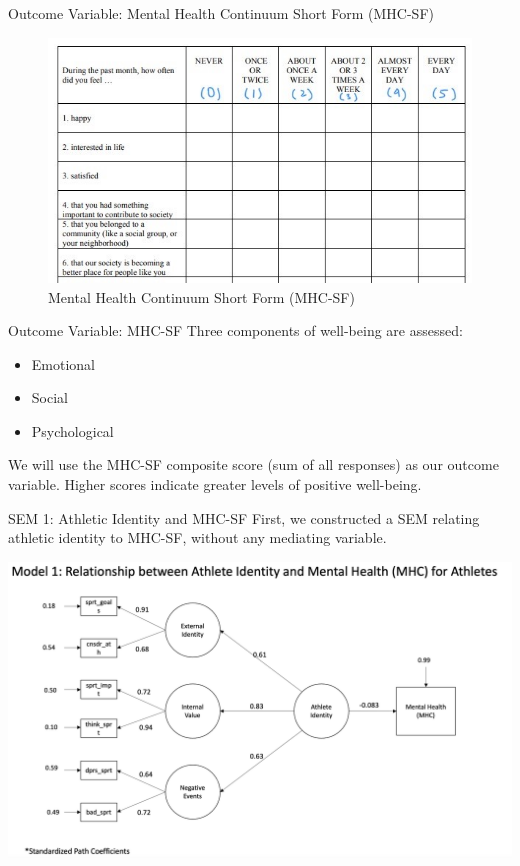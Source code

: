 \documentclass[
  ignorenonframetext,
]{beamer}
\providecommand{\tightlist}{%
  \setlength{\itemsep}{0pt}\setlength{\parskip}{0pt}}
\begin{document}
\begin{frame}{Outcome Variable: Mental Health Continuum Short Form
(MHC-SF)}
\protect\hypertarget{outcome-variable-mental-health-continuum-short-form-mhc-sf}{}
\centering

\begin{figure}
\centering
\includegraphics{images/mhc_sf.jpg}
\caption{Mental Health Continuum Short Form (MHC-SF)}
\end{figure}
\end{frame}

\begin{frame}{Outcome Variable: MHC-SF}
\protect\hypertarget{outcome-variable-mhc-sf}{}
Three components of well-being are assessed:

\begin{itemize}
\tightlist
\item
  Emotional
\item
  Social
\item
  Psychological
\end{itemize}

We will use the MHC-SF composite score (sum of all responses) as our
outcome variable. Higher scores indicate greater levels of positive
well-being.
\end{frame}

\begin{frame}{SEM 1: Athletic Identity and MHC-SF}
\protect\hypertarget{sem-1-athletic-identity-and-mhc-sf}{}
First, we constructed a SEM relating athletic identity to MHC-SF,
without any mediating variable.

\centering

\includegraphics{images/SEM_1.png}
\end{frame}
\end{document}
